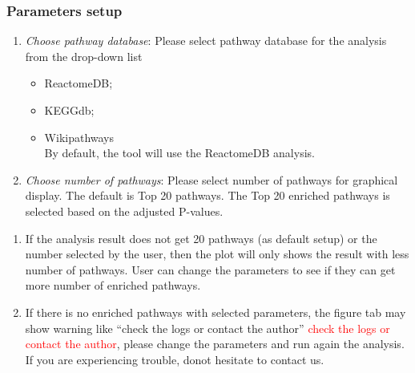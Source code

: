 \documentclass[
  a4paper,
  oneside,
  open=any]{scrreport}
\providecommand{\tightlist}{%
  \setlength{\itemsep}{0pt}\setlength{\parskip}{0pt}}\usepackage{longtable,booktabs,array}
\begin{document}
\hypertarget{parameters-setup-2}{%
\subsubsection{Parameters setup}\label{parameters-setup-2}}

\begin{enumerate}
\def\labelenumi{\arabic{enumi}.}
\tightlist
\item
  \emph{Choose pathway database}: Please select pathway database for the
  analysis from the drop-down list

  \begin{itemize}
  \tightlist
  \item
    ReactomeDB;
  \item
    KEGGdb;
  \item
    Wikipathways\\
    By default, the tool will use the ReactomeDB analysis.
  \end{itemize}
\item
  \emph{Choose number of pathways}: Please select number of pathways for
  graphical display. The default is Top 20 pathways. The Top 20 enriched
  pathways is selected based on the adjusted P-values.
\end{enumerate}

\begin{tcolorbox}[enhanced jigsaw, left=2mm, colback=white, breakable, leftrule=.75mm, coltitle=black, toprule=.15mm, rightrule=.15mm, colbacktitle=quarto-callout-tip-color!10!white, title=\textcolor{quarto-callout-tip-color}{\faLightbulb}\hspace{0.5em}{Tip}, opacitybacktitle=0.6, colframe=quarto-callout-tip-color-frame, bottomrule=.15mm, bottomtitle=1mm, toptitle=1mm, titlerule=0mm, opacityback=0, arc=.35mm]

\begin{enumerate}
\def\labelenumi{\arabic{enumi}.}
\tightlist
\item
  If the analysis result does not get 20 pathways (as default setup) or
  the number selected by the user, then the plot will only shows the
  result with less number of pathways. User can change the parameters to
  see if they can get more number of enriched pathways.
\item
  If there is no enriched pathways with selected parameters, the figure
  tab may show warning like {``check the logs or contact the author''}
  \textcolor{red}{check the logs or contact the author}, please change
  the parameters and run again the analysis. If you are experiencing
  trouble, donot hesitate to contact us.
\end{enumerate}

\end{tcolorbox}
\end{document}
